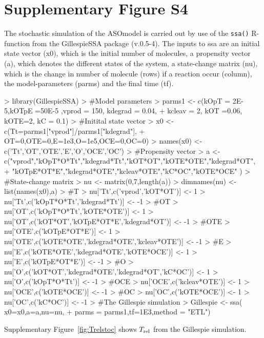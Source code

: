\documentclass[a4paper,11pt]{article}
\newcommand{\Trel}{T_{\rm{rel}}}
\begin{document}
\section{Supplementary Figure S4}
The stochastic simulation of the ASOmodel is carried out by use of the \texttt{ssa()} R-function from the GillespieSSA package (v.0.5-4). The inputs to ssa are an initial state vector (x0), which is the initial number of molecules, a propensity vector (a), which denotes the different states of the system, a state-change matrix (nu), which is the change in number of molecule (rows) if a reaction occur (column), the model-parameters (parms) and the final time (tf).
\begin{Schunk}
\begin{Sinput}
> library(GillespieSSA)
> #Model parameters
> parms1 <- c(kOpT = 2E-5,kOTpE =50E-5 ,vprod = 150,  kdegrad = 0.04,		  
+               kcleav = 2, kOT =0.06, kOTE=2, kC = 0.1)
> #Initital state vector
> x0 <- c(Tt=parms1["vprod"]/parms1["kdegrad"],
+         OT=0,OTE=0,E=1e3,O=1e5,OCE=0,OC=0)
> names(x0) <- c('Tt','OT','OTE','E','O','OCE','OC')
> #Propensity vector
> a <-  c("vprod","kOpT*O*Tt","kdegrad*Tt","kOT*OT","kOTE*OTE","kdegrad*OT",
+         "kOTpE*OT*E","kdegrad*OTE","kcleav*OTE","kC*OC","kOTE*OCE" )
> #State-change matrix
> nu <- matrix(0,7,length(a))
> dimnames(nu) <- list(names(x0),a)
> #T
> nu['Tt',c('vprod','kOT*OT')] <- 1
> nu['Tt',c('kOpT*O*Tt','kdegrad*Tt')] <- -1 
> #OT
> nu['OT',c('kOpT*O*Tt','kOTE*OTE')] <- 1
> nu['OT',c('kOT*OT','kOTpE*OT*E','kdegrad*OT')] <- -1
> #OTE
> nu['OTE',c('kOTpE*OT*E')] <- 1
> nu['OTE',c('kOTE*OTE','kdegrad*OTE','kcleav*OTE')] <- -1
> #E
> nu['E',c('kOTE*OTE','kdegrad*OTE','kOTE*OCE')] <- 1
> nu['E',c('kOTpE*OT*E')] <- -1
> #O
> nu['O',c('kOT*OT','kdegrad*OTE','kdegrad*OT','kC*OC')] <- 1
> nu['O',c('kOpT*O*Tt')] <- -1
> #OCE
> nu['OCE',c('kcleav*OTE')] <- 1
> nu['OCE',c('kOTE*OCE')] <- -1
> #OC
> nu['OC',c('kOTE*OCE')] <- 1
> nu['OC',c('kC*OC')] <- -1
> #The Gillespie simulation
> Gillespie <- ssa( x0=x0,a=a,nu=nu,
+       parms = parms1,tf=1E3,method = "ETL")
\end{Sinput}
\end{Schunk}
Supplementary Figure~\ref{fig:Trelstoc} shows $\Trel$ from the Gillespie simulation.
\end{document}
